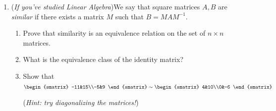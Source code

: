 \begin{exercises}{}{}
\begin{enumerate}

  \item (\emph{If you've studied Linear Algebra})\lstsp We say that square matrices $A,B$ are \emph{similar} if there exists a matrix $M$ such that $B=MAM^{-1}$.
  \begin{enumerate}
    \item Prove that similarity is an equivalence relation on the set of $n\times n$ matrices.
    \item What is the equivalence class of the identity matrix?
    \item Show that 
   	$\begin{smatrix}
    	-11&15\\-5&9
    \end{smatrix}
		\sim
		\begin{smatrix}
    	4&10\\0&-6
    \end{smatrix}$
    \par
    (\emph{Hint: try diagonalizing the matrices!})
	\end{enumerate}


\end{enumerate}
\end{exercises}
